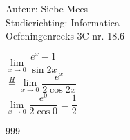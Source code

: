 \documentclass[a4paper]{article}
\begin{document}
  
\noindent \large Auteur: Siebe Mees \\
\noindent \large Studierichting: Informatica\\
\noindent \large Oefeningenreeks 3C nr. 18.6\\

\medskip

\normalsize

$\lim\limits_{x \rightarrow 0} \dfrac{e^x-1}{\sin2x}$\\

$\overset{H}{=}  \lim\limits_{x \rightarrow 0} \dfrac{e^x}{2\cos2x} $\\

$  \lim\limits_{x \rightarrow 0} \dfrac{e^0}{2\cos0} = \dfrac{1}{2} $\\

\begin{thebibliography}{999}
\end{thebibliography}
\end{document}
